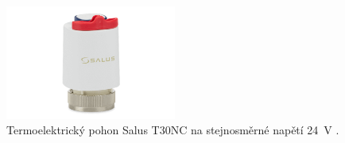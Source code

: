 \begin{figure}[H]
    \centering
    \includegraphics[width=0.5\textwidth]{images/termoelektricky-pohon-salus-t30nc-24-v.png}
    \caption[Termoelektrický pohon Salus T30NC.]{Termoelektrický pohon Salus T30NC na stejnosměrné napětí 24~V \cite{termoelektricky-pohon-t30nc}.}
    \label{fig:termoelektricky-pohon-salus-t30nc-24-v}
\end{figure}